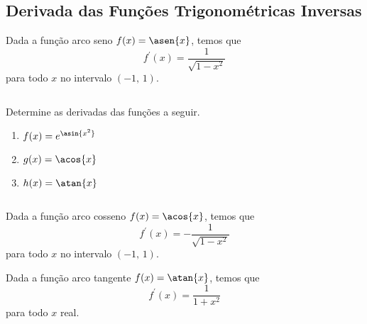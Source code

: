 \subsection{Derivada das Funções Trigonométricas Inversas}
\begin{frame}
  \begin{theorem}
    Dada a função arco seno $f(x) = \asen{x}$, temos que 
    \begin{equation*}
      f^{\prime}(x) = \frac{1}{\sqrt{1-x^{2}}}
    \end{equation*}
    para todo $x$ no intervalo $(-1,\,1)$.
  \end{theorem}
  \begin{columns}[onlytextwidth]
    \begin{column}{0.55\textwidth}
      \begin{example-highlight}
        Determine as derivadas das funções a seguir.
        \begin{enumerate}
          \item $f(x) = e^{\asin{x^{2}}}$
          \item $g(x) = \acos{x}$
          \item $h(x) = \atan{x}$
        \end{enumerate}
      \end{example-highlight}
    \end{column}
    \begin{column}{0.43\textwidth}
    \end{column}
  \end{columns}
\end{frame}

\begin{frame}
  \begin{theorem}
    Dada a função arco cosseno $f(x) = \acos{x}$, temos que 
    \begin{equation*}
      f^{\prime}(x) = -\frac{1}{\sqrt{1-x^{2}}}
    \end{equation*}
    para todo $x$ no intervalo $(-1,\,1)$.
  \end{theorem}
  \vfill
  \begin{theorem}
    Dada a função arco tangente $f(x) = \atan{x}$, temos que 
    \begin{equation*}
      f^{\prime}(x) = \frac{1}{1+x^{2}}
    \end{equation*}
    para todo $x$ real.
  \end{theorem}
\end{frame}

